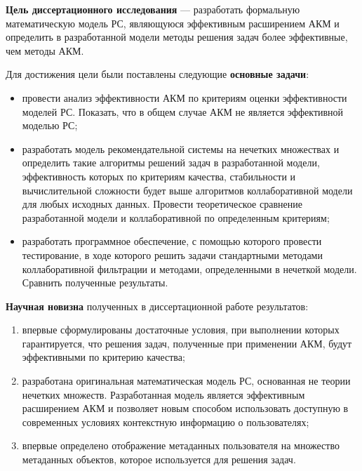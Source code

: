 {\bf Цель диссертационного исследования} --- разработать
формальную математическую модель РС, являющуюся эффективным расширением
АКМ и определить в разработанной модели
методы решения задач более эффективные, чем методы АКМ.

Для достижения цели были поставлены следующие
{\bf основные задачи}:
\begin{itemize}
	\item
		провести анализ эффективности АКМ по критериям оценки
		эффективности моделей РС. Показать, что в общем случае
		АКМ не является эффективной моделью РС;
	\item разработать модель рекомендательной системы на нечетких
		множествах и определить такие алгоритмы решений задач в разработанной
		модели, эффективность которых по критериям качества, стабильности и
		вычислительной
		сложности будет выше алгоритмов коллаборативной модели для любых
		исходных данных.
		Провести теоретическое сравнение разработанной модели и
		коллаборативной по определенным критериям;
	\item разработать программное обеспечение, с помощью которого
		провести тестирование, в ходе которого решить задачи стандартными
		методами коллаборативной фильтрации и методами, определенными в
		нечеткой модели. Сравнить полученные результаты.
\end{itemize}

{\bf Научная новизна} полученных в диссертационной работе результатов:
\begin{enumerate}
\item впервые сформулированы достаточные условия, при выполнении которых гарантируется,
	что решения задач, полученные при применении АКМ,
	будут эффективными по критерию качества;
\item разработана оригинальная математическая модель РС, основанная не теории
	нечетких множеств. Разработанная модель
	является эффективным расширением АКМ и
	позволяет новым способом использовать доступную в современных
	условиях контекстную информацию о пользователях;
\item впервые определено отображение метаданных пользователя
	на множество метаданных объектов, которое используется для решения задач.
\end{enumerate}

